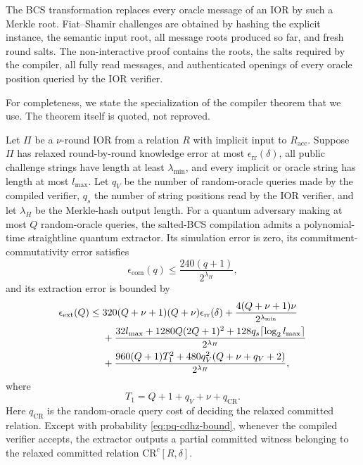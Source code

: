 The BCS transformation \cite{BenSassonChiesaSpooner16} replaces every oracle message of an IOR by such a Merkle root.  Fiat--Shamir challenges are obtained by hashing the explicit instance, the semantic input root, all message roots produced so far, and fresh round salts.  The non-interactive proof contains the roots, the salts required by the compiler, all fully read messages, and authenticated openings of every oracle position queried by the IOR verifier.

For completeness, we state the specialization of the compiler theorem that we use.  The theorem itself is quoted, not reproved.

\begin{theorem}
\label{thm:pq-cdhz}
Let $\Pi$ be a $\nu$-round IOR from a relation $R$ with implicit input to $R_{\mathrm{acc}}$.  Suppose $\Pi$ has relaxed round-by-round knowledge error at most $\epsilon_{\mathrm{rr}}(\delta)$, all public challenge strings have length at least $\lambda_{\min}$, and every implicit or oracle string has length at most $l_{\max}$.  Let $q_V$ be the number of random-oracle queries made by the compiled verifier, $q_s$ the number of string positions read by the IOR verifier, and let $\lambda_H$ be the Merkle-hash output length.  For a quantum adversary making at most $Q$ random-oracle queries, the salted-BCS compilation admits a polynomial-time straightline quantum extractor.  Its simulation error is zero, its commitment-commutativity error satisfies
\[
  \epsilon_{\mathrm{com}}(q)
  \le \frac{240(q+1)}{2^{\lambda_H}},
\]
and its extraction error is bounded by
\begin{align}
 \epsilon_{\mathrm{ext}}(Q)
 \le{}&320(Q+\nu+1)(Q+\nu)\epsilon_{\mathrm{rr}}(\delta)
      +\frac{4(Q+\nu+1)\nu}{2^{\lambda_{\min}}}
 \notag\\
 &+\frac{32l_{\max}
      +1280Q(2Q+1)^2
      +128q_s\lceil\log_2 l_{\max}\rceil}{2^{\lambda_H}}
 \notag\\
 &+\frac{960(Q+1)T_1^2
      +480q_V^2(Q+\nu+q_V+2)}{2^{\lambda_H}},
 \label{eq:pq-cdhz-bound}
\end{align}
where
\[
  T_1=Q+1+q_V+\nu+q_{\mathrm{CR}}.
\]
Here $q_{\mathrm{CR}}$ is the random-oracle query cost of deciding the relaxed committed relation.  Except with probability \eqref{eq:pq-cdhz-bound}, whenever the compiled verifier accepts, the extractor outputs a partial committed witness belonging to the relaxed committed relation $\mathrm{CR}^c[R,\delta]$.
\end{theorem}

